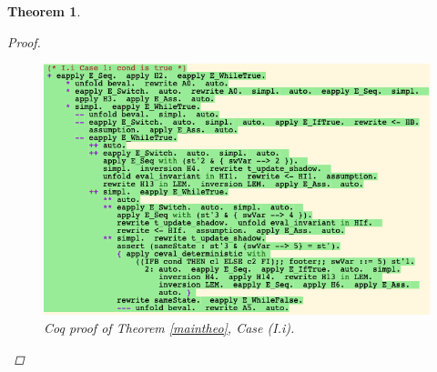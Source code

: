 \documentclass[12pt,notitlepage]{report}
\theoremstyle{plain}
\newtheorem{theo}{Theorem}[section]
\theoremstyle{definition}
\numberwithin{equation}{section}
\begin{document}
\begin{theo}
\begin{proof}
\begin{itemize}
\begin{itemize}
                \noindent\begin{figure}[H]
        \centering
        \includegraphics[scale=0.6]{alltrans_1_1}
        \caption{Coq proof of Theorem \ref{maintheo}, Case (I.i).}
        \label{fig:maintheo1}
        \end{figure}
                

\end{itemize}
\end{itemize}
\end{proof}
\end{theo}
\end{document}
